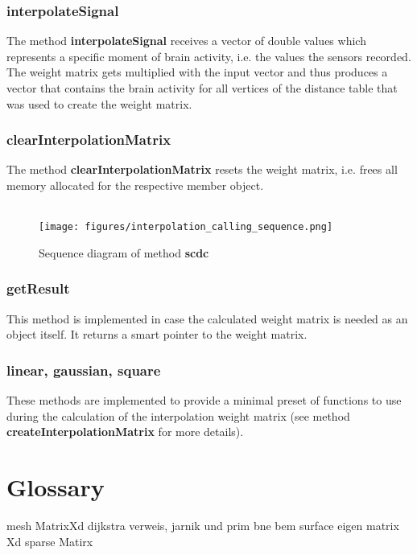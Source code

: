 \subsubsection{interpolateSignal}
The method \textbf{interpolateSignal} receives a vector of double values which represents a specific moment of brain activity, i.e. the values the sensors recorded. The weight matrix gets multiplied with the input vector and thus produces a vector that contains the brain activity for all vertices of the distance table that was used to create the weight matrix.

\subsubsection{clearInterpolationMatrix}
The method \textbf{clearInterpolationMatrix} resets the weight matrix, i.e. frees all memory allocated for the respective member object.
\\\\

\begin{figure}[h]
	\begin{center}
		\texttt{[image: figures/interpolation\_calling\_sequence.png]}
		\caption{Sequence diagram of method \textbf{scdc}}
	\end{center}
\end{figure}

\subsubsection{getResult}
This method is implemented in case the calculated weight matrix is needed as an object itself. It returns a smart pointer to the weight matrix.

\subsubsection{linear, gaussian, square}
These methods are implemented to provide a minimal preset of functions to use during the calculation of the interpolation weight matrix (see method \textbf{createInterpolationMatrix} for more details).

\clearpage

\section{Glossary}
mesh
MatrixXd
dijkstra verweis,
jarnik und prim
bne bem surface
eigen matrix Xd
sparse Matirx

  

